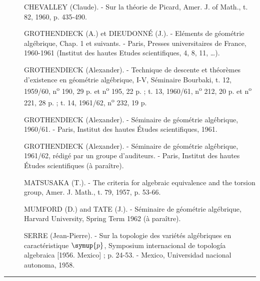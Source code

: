 \begin{description}
\item[{\normalfont [1]}] CHEVALLEY (Claude). - Sur la théorie de Picard,
Amer. J. of Math., t. 82, 1960, p. 435-490.

\item[{\normalfont [2]}] GROTHENDIECK (A.) et DIEUDONNÉ (J.). - Eléments de géométrie
algébrique, Chap. 1 et suivants. - Paris, Presses universitaires de France,
1960-1961 (Institut des hautes Etudes scientifiques, 4, 8, 11, \ldots).

\item[{\normalfont [3]}] GROTHENDIECK (Alexander). - Technique de descente et théorèmes
d'existence en géométrie algébrique, I-V, Séminaire Bourbaki, t. 12,
1959/60, n\textsuperscript{o} 190, 29 p. et n\textsuperscript{o} 195, 22 p. ;
t. 13, 1960/61, n\textsuperscript{o} 212, 20 p. et
n\textsuperscript{o} 221, 28 p. ; t. 14, 1961/62,
n\textsuperscript{o} 232, 19 p.

\item[{\normalfont [4]}] GROTHENDIECK (Alexander). - Séminaire de géométrie algébrique,
1960/61. - Paris, Institut des hautes Études scientifiques, 1961.

\item[{\normalfont [5]}] GROTHENDIECK (Alexander). - Séminaire de géométrie algébrique,
1961/62, rédigé par un groupe d'auditeurs. - Paris, Institut des hautes Études
scientifiques (à paraître).

\item[{\normalfont [6]}] MATSUSAKA (T.). - The criteria for algebraic equivalence and the
torsion group, Amer. J. Math., t. 79, 1957, p. 53-66.

\item[{\normalfont [7]}] MUMFORD (D.) and TATE (J.). - Séminaire de géométrie algébrique,
Harvard University, Spring Term 1962 (à paraître).

\item[{\normalfont [8]}] SERRE (Jean-Pierre). - Sur la topologie des variétés algébriques
en caractéristique $\symup{p}$, Symposium internacional de topología algebraica
[1956. Mexico] ; p. 24-53. - Mexico, Universidad nacional autonoma, 1958.
\end{description}

\begin{center}\rule{2.5cm}{0.4pt}\end{center}
